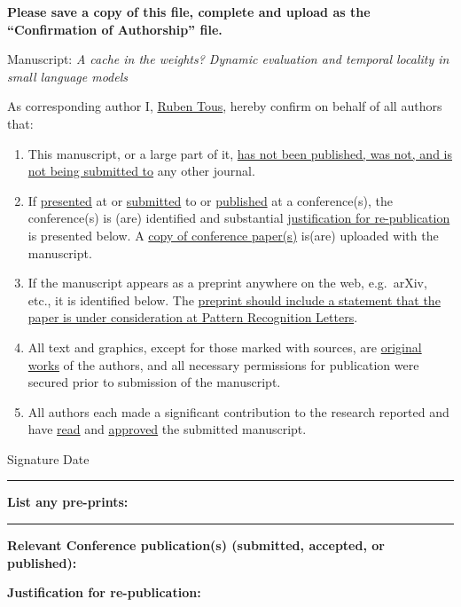 \documentclass[11pt]{article}
\begin{document}
\vskip6pt

\vskip1pc
{\bf Please save a copy of this file, complete and upload as the ``Confirmation of Authorship'' file.}

\vskip1pc
\noindent Manuscript: \emph{A cache in the weights? Dynamic evaluation and temporal locality in small language models}

\vskip1pc
\noindent As corresponding author I, \underline{Ruben Tous\hphantom{\hspace*{5cm}}}, hereby confirm on behalf of all authors that:

\vskip1pc
\begin{enumerate}
\itemsep=3pt
\item This manuscript, or a large part of it, \underline{has not been published, was not, and is not being submitted to} any other journal.
\item If \underline{presented} at or \underline{submitted} to or \underline{published} at a conference(s), the conference(s) is (are) identified and substantial \underline{justification for re-publication} is presented below. A \underline{copy of conference paper(s)} is(are) uploaded with the manuscript.
\item If the manuscript appears as a preprint anywhere on the web, e.g.\ arXiv, etc., it is identified below. The \underline{preprint should include a statement that the paper is under consideration at Pattern Recognition Letters}.
\item All text and graphics, except for those marked with sources, are \underline{original works} of the authors, and all necessary permissions for publication were secured prior to submission of the manuscript.
\item All authors each made a significant contribution to the research reported and have \underline{read} and \underline{approved} the submitted manuscript.
\end{enumerate}

\vskip1pc
\noindent Signature\underline{\hphantom{\hspace*{7cm}}} Date\underline{\hphantom{\hspace*{4cm}}}

\vskip1pc
\noindent\rule{\textwidth}{2pt}
\vskip1pc
{\bf List any pre-prints:}

\vskip5pc
\noindent\rule{\textwidth}{2pt}
\vskip1pc
{\bf Relevant Conference publication(s) (submitted, accepted, or published):}

\vskip5pc
{\bf Justification for re-publication:}
\end{document}
